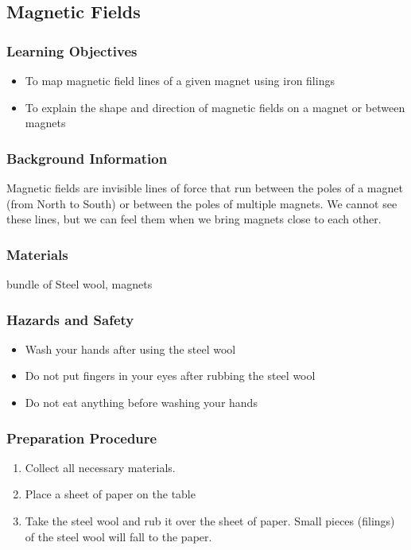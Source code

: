 \subsection{Magnetic Fields}

\subsubsection*{Learning Objectives}
\begin{itemize}
\item{To map magnetic field lines of a given magnet using iron filings}
\item{To explain the shape and direction of magnetic fields on a magnet or between magnets}
\end{itemize}

\subsubsection*{Background Information}
Magnetic fields are invisible lines of force that run between the poles of a magnet (from North to South) or between the poles of multiple magnets.  We cannot see these lines, but we can feel them when we bring magnets close to each other.

\subsubsection*{Materials}
bundle of Steel wool, magnets

\subsubsection*{Hazards and Safety}
\begin{itemize}
\item{Wash your hands after using the steel wool}
\item{Do not put fingers in your eyes after rubbing the steel wool}
\item{Do not eat anything before washing your hands}
\end{itemize}

\subsubsection*{Preparation Procedure}
\begin{enumerate}
\item{Collect all necessary materials.}
\item{Place a sheet of paper on the table}
\item{Take the steel wool and rub it over the sheet of paper.  Small pieces (filings) of the steel wool will fall to the paper.}
\end{enumerate}

